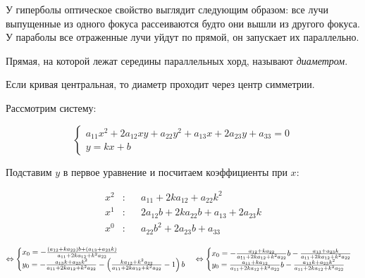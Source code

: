 \begin{Rem}
	У гиперболы оптическое свойство выглядит следующим образом: все лучи выпущенные из одного фокуса рассеиваются будто они вышли из другого фокуса. 
	У параболы все отраженные лучи уйдут по прямой, он запускает их параллельно. 
\end{Rem}

\begin{figure}[h]
	\centering
	\def\svgwidth{.7\columnwidth}
		
\end{figure}


\begin{Def}
	Прямая, на которой лежат середины параллельных хорд, называют \textit{диаметром}.
\end{Def}

\begin{Rem}
	Если кривая центральная, то диаметр проходит через центр симметрии.
\end{Rem}

Рассмотрим систему:

\[\begin{cases}
	a_{11} x^2 + 2 a_{12} xy + a_{22} y^2 + a_{13} x + 2 a_{23} y + a_{33} = 0 \\
	y = kx + b
\end{cases}\]

\begin{figure}
	\centering
	\def\svgwidth{.2\columnwidth}
	
\end{figure}

Подставим $y$ в первое уравнение и посчитаем коэффициенты при $x$:

\begin{align*}
	x^2 &: &&a_{11} + 2ka_{12} + a_{22} k^2 \\
	x^1 &: &&2a_{12} b + 2ka_{22} b + a_{13} + 2a_{23} k \\
	x^0 &: &&a_{22} b^2 + 2a_{23} b + a_{33}
\end{align*}

\[\Leftrightarrow \begin{cases}
	x_0 = - \frac{(a_{12} + k a_{22}) b + (a_{13} + a_{23}k)}{a_{11} + 2ka_{12} + k^2 a_{22}} \\
	y_0 = - \frac{a_{13} k + a_{23} k^2}{a_{11} + 2ka_{12} + k^2a_{22}} - \left( \frac{ka_{12} + k^2 a_{22}}{a_{11} + 2ka_{12} + k^2 a_{22}} - 1\right)b
\end{cases} \Leftrightarrow \begin{cases}
		x_0 = - \frac{a_{12} + ka_{22}}{a_{11} + 2ka_{12} + k^2a_{22}}b - \frac{a_{13} + a_{23}k}{a_{11} + 2ka_{12} + k^2 a_{22}} \\
		y_0 = \frac{a_{11} + ka_{12}}{a_{11} + 2ka_{12} + k^2a_{22}}b - \frac{a_{13}k + a_{23} k^2}{a_{11} + 2ka_{12} + k^2 a_{22}}
	\end{cases}\]

